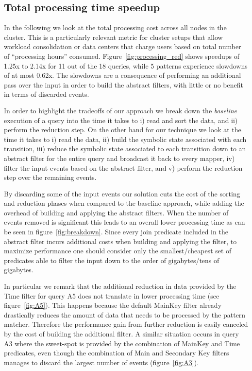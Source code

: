 \subsection{Total processing time speedup}

In the following we look at the total processing cost across all nodes in the
cluster.
This is a particularly relevant metric for cluster setups that allow workload
consolidation or data centers that charge users based on total number of
``processing hours'' consumed.
Figure~\ref{fig:processing_red} shows speedups of 1.25x to 2.14x for 11 out of
the 18 queries, while 5 patterns experience slowdowns of at most 0.62x.
The slowdowns are a consequence of performing an additional pass over the input
in order to build the abstract filters, with little or no benefit in terms of
discarded events.

In order to highlight the tradeoffs of our approach we break down the {\em
baseline} execution of a query into the time it takes to 
i) read and sort the data, and 
ii) perform the reduction step.
On the other hand for our technique we look at the time it takes to 
i) read the data, 
ii) build the symbolic state associated with each transition,
iii) reduce the symbolic state associated to each transition down to an abstract
filter for the entire query and broadcast it back to every mapper,
iv) filter the input events based on the abstract filter, and
v) perform the reduction step over the remaining events. 

By discarding some of the input events our solution cuts the cost
of the sorting and reduction phases when compared to the baseline approach,
while adding the overhead of building and applying the abstract filters.
When the number of events removed is significant this leads to an overall lower
processing time as can be seen in figure~\ref{fig:breakdown}.
Since every join predicate included in the abstract filter incurs additional
costs when building and applying the filter, to maximize performance one should
consider only the smallest/cheapest set of predicates able to filter the input
down to the order of gigabytes/tens of gigabytes.


In particular we remark that the additional reduction in data provided by the
Time filter for query A5 does not translate in lower processing time (see
figure~\ref{fig:A5}).
This happens because the default MainKey filter already drastically reduces
the amount of data that needs to be processed by the pattern matcher. 
Therefore the performance gain from further reduction is easily canceled by the
cost of building the additional filter.
A similar situation occurs in query A3 where the sweet-spot is provided by the
combination of MainKey and Time predicates, even though the combination of
Main and Secondary Key filters manages to discard the largest number of events 
(figure~\ref{fig:A3}).





